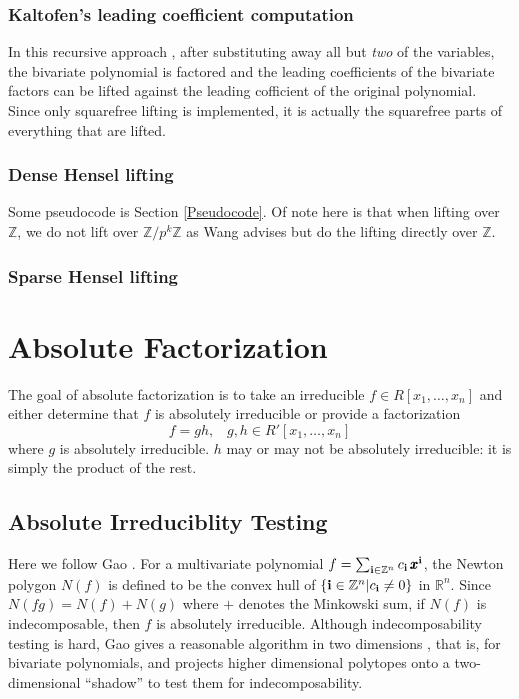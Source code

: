 \documentclass[11pt,reqno]{amsart}
\numberwithin{equation}{section}
\begin{document}
\subsubsection{Kaltofen's leading coefficient computation}
In this recursive approach \cite{KALTOFEN}, after substituting away all but \emph{two} of the variables, the bivariate polynomial is factored and the leading coefficients of the bivariate factors can be lifted against the leading cofficient of the original polynomial. Since only squarefree lifting is implemented, it is actually the squarefree parts of everything that are lifted.

\subsubsection{Dense Hensel lifting}
Some pseudocode is Section \ref{Pseudocode}. Of note here is that when lifting over $\mathbb{Z}$, we do not lift over $\mathbb{Z}/p^k\mathbb{Z}$ as Wang \cite{WANG} advises but do the lifting directly over $\mathbb{Z}$.

\subsubsection{Sparse Hensel lifting}


\section{Absolute Factorization}

The goal of absolute factorization is to take an irreducible $f \in R[x_1, \dots, x_n]$ and either determine that $f$ is absolutely irreducible or provide a factorization
\begin{equation*}
f = g h \text{,} \quad g, h \in R'[x_1, \dots, x_n]
\end{equation*}
where $g$ is absolutely irreducible. $h$ may or may not be absolutely irreducible: it is simply the product of the rest.

\subsection{Absolute Irreduciblity Testing}
Here we follow Gao \cite{GAO}. For a multivariate polynomial $f = \sum_{\bold{i} \in \mathbb{Z}^n}{c_{\bold{i}} \, \pmb{x}^{\bold{i}}}$, the Newton polygon $N(f)$ is defined to be the convex hull of $\{\bold{i} \in \mathbb{Z}^n | c_{\bold{i}} \ne 0\}$ in $\mathbb{R}^n$.
Since $N(fg) = N(f) + N(g)$ where $+$ denotes the Minkowski sum, if $N(f)$ is indecomposable, then $f$ is absolutely irreducible. Although indecomposability testing is hard, Gao gives a reasonable algorithm in two dimensions \cite{GAO2}, that is, for bivariate polynomials, and projects higher dimensional polytopes onto a two-dimensional ``shadow'' to test them for indecomposability.
\end{document}

